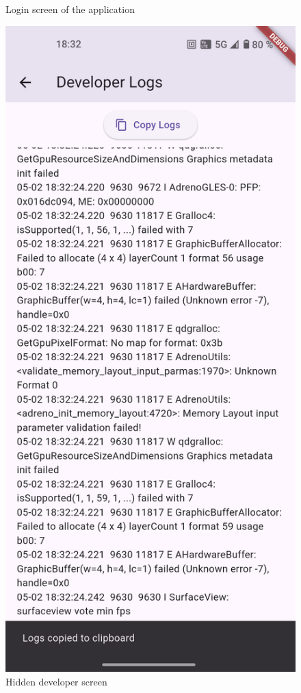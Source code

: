 \documentclass[
  digital,     %
  oneside,     %
  nosansbold,  %
  nocolorbold, %
  lof,         %
  lot,         %
]{fithesis4}
\begin{document}
\begin{center}
\begin{minipage}{0.45\textwidth}
\begin{figure}[H]
    \caption{Login screen of the application}
    \label{fig:login_screen}
  \end{figure}
\end{minipage}
\hspace{0.05\textwidth}
\begin{minipage}{0.45\textwidth}
  \begin{figure}[H]
    \centering
    \includegraphics[width=\textwidth]{assets/developer_screen.png}
    \caption{Hidden developer screen}
    \label{fig:developer_screen}
  \end{figure}
\end{minipage}
\end{center}
\end{document}
